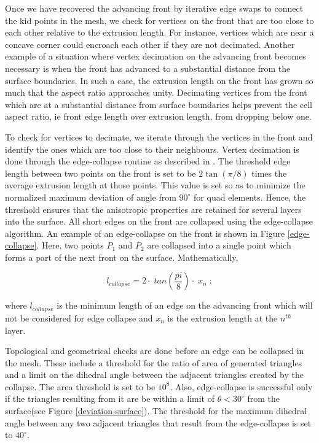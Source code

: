 Once we have recovered the advancing front by iterative edge swaps to connect the kid points in the mesh, we check for vertices on the front that are too close to each other relative to the extrusion length. For instance, vertices which are near a concave corner could encroach each other if they are not decimated. Another example of a situation where vertex decimation on the advancing front becomes necessary is when the front has advanced to a substantial distance from the surface boundaries. In such a case, the extrusion length on the front has grown so much that the aspect ratio approaches unity. Decimating vertices from the front which are at a substantial distance from surface boundaries helps prevent the cell aspect ratio, ie front edge length over extrusion length, from dropping below one.

To check for vertices to decimate, we iterate through the vertices in the front and identify the ones which are too close to their neighbours. Vertex decimation is done through the edge-collapse routine as described in \cite{hoppe1994mesh}. The threshold edge length between two points on the front is set to be $2 \tan(\pi/8)$ times the average extrusion length at those points. This value is set so as to minimize the normalized maximum deviation of angle from $90^\circ$ for quad elements. Hence, the threshold ensures that the anisotropic properties are retained for several layers into the surface. All short edges on the front are collapsed using the edge-collapse algorithm. An example of an edge-collapse on the front is shown in Figure \ref{edge-collapse}. Here, two points $P_1$ and $P_2$ are collapsed into a single point which forms a part of the next front on the surface. Mathematically,

\begin{equation}
l_{\mathit{collapse}} = 2 \cdot \; tan \left( \frac{pi}{8} \right) \cdot \; x_n \; ;
\end{equation}

where $l_{\mathit{collapse}}$ is the minimum length of an edge on the advancing front which will not be considered for edge collapse and $x_n$ is the extrusion length at the $n^{th}$ layer.


Topological and geometrical checks are done before an edge can be collapsed in the mesh. These include a threshold for the ratio of area of generated triangles and a limit on the dihedral angle between the adjacent triangles created by the collapse. The area threshold is set to be $10^8$. Also, edge-collapse is successful only if the triangles resulting from it are be within a limit of $\theta < 30^{\circ}$ from the surface(see Figure \ref{deviation-surface}). The threshold for the maximum dihedral angle between any two adjacent triangles that result from the edge-collapse is set to $40^{\circ}$. 

